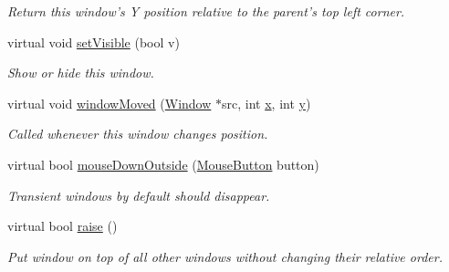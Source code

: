 \begin{DoxyCompactItemize}
\begin{DoxyCompactList}\small\item\em Return this window's Y position relative to the parent's top left corner. \end{DoxyCompactList}\item 
virtual void \hyperlink{classGUI_1_1TransientWindow_a5581ee490ae2ce490ca45e234f6712a2}{set\-Visible} (bool v)
\begin{DoxyCompactList}\small\item\em Show or hide this window. \end{DoxyCompactList}\item 
\hypertarget{classGUI_1_1TransientWindow_a7d6a4d5dbcc98148e501734d8abb85b0}{virtual void \hyperlink{classGUI_1_1TransientWindow_a7d6a4d5dbcc98148e501734d8abb85b0}{window\-Moved} (\hyperlink{classGUI_1_1Window}{Window} $\ast$src, int \hyperlink{classGUI_1_1Window_a6ca6a80ca00c9e1d8ceea8d3d99a657d}{x}, int \hyperlink{classGUI_1_1Window_a0ee8e923aff2c3661fc2e17656d37adf}{y})}\label{classGUI_1_1TransientWindow_a7d6a4d5dbcc98148e501734d8abb85b0}

\begin{DoxyCompactList}\small\item\em Called whenever this window changes position. \end{DoxyCompactList}\item 
virtual bool \hyperlink{classGUI_1_1TransientWindow_aa66cecd7ddcd0f8cf7a63cc5cc897acf}{mouse\-Down\-Outside} (\hyperlink{namespaceGUI_ad06082a7b02aa73697f39eb8e0856de9}{Mouse\-Button} button)
\begin{DoxyCompactList}\small\item\em Transient windows by default should disappear. \end{DoxyCompactList}\item 
\hypertarget{classGUI_1_1TransientWindow_a970674e955de6a1d5a0966953e56c587}{virtual bool \hyperlink{classGUI_1_1TransientWindow_a970674e955de6a1d5a0966953e56c587}{raise} ()}\label{classGUI_1_1TransientWindow_a970674e955de6a1d5a0966953e56c587}

\begin{DoxyCompactList}\small\item\em Put window on top of all other windows without changing their relative order. \end{DoxyCompactList}\end{DoxyCompactItemize}
